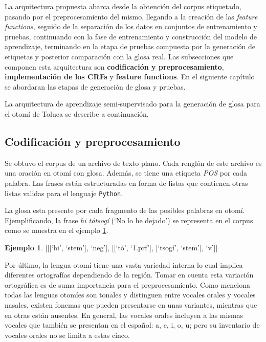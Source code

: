 \documentclass[letterpaper,12pt,oneside]{book}
\def\code#1{\texttt{#1}}
\theoremstyle{definition}
\newtheorem{exmp}{Ejemplo}[section]
\begin{document}
La arquitectura propuesta abarca desde la obtención del corpus etiquetado, pasando por el preprocesamiento del mismo, llegando a la creación de las \textit{feature functions}, seguido de la separación de los datos en conjuntos de entrenamiento y pruebas, continuando con la fase de entrenamiento y construcción del modelo de aprendizaje, terminando en la etapa de pruebas compuesta por la generación de etiquetas y posterior comparación con la glosa real. Las subsecciones que componen esta arquitectura son \textbf{codificación y preprocesamiento}, \textbf{implementación de los CRFs} y \textbf{feature functions}. En el siguiente capítulo se abordaran las etapas de generación de glosa y pruebas.

La arquitectura de aprendizaje semi-supervisado para la generación de glosa para el otomí de Toluca se describe a continuación.

\subsection{Codificación y preprocesamiento}

Se obtuvo el corpus de un archivo de texto plano. Cada renglón de este archivo es una oración en otomí con glosa. Además, se tiene una etiqueta \textit{POS} por cada palabra. Las frases están estructuradas en forma de listas que contienen otras listas validas para el lenguaje \code{Python}.

La glosa esta presente por cada fragmento de las posibles palabras en otomí. Ejemplificando, la frase \textit{hi tótsogí} (`No lo he dejado') se representa en el corpus como se muestra en el ejemplo \ref{exmp:frase_glosada}.

\begin{exmp} \label{exmp:frase_glosada}
    \textsf{[[[`hi', `stem'], `neg'],
    [[`tó', `1.prf'],
    [`tsogí', `stem'], `v']]}
\end{exmp}

Por último, la lengua otomí tiene una vasta variedad interna lo cual implica diferentes ortografías dependiendo de la región. Tomar en cuenta esta variación ortográfica es de suma importancia para el preprocesamiento. Como menciona \cite{elotl2019otomiprepro} todas las lenguas otomíes son tonales y distinguen entre vocales orales y vocales nasales, existen fonemas que pueden presentarse en unas variantes, mientras que en otras están ausentes. En general, las vocales orales incluyen a las mismas vocales que también se presentan en el español: a, e, i, o, u; pero su inventario de vocales orales no se limita a estas cinco.
\end{document}
